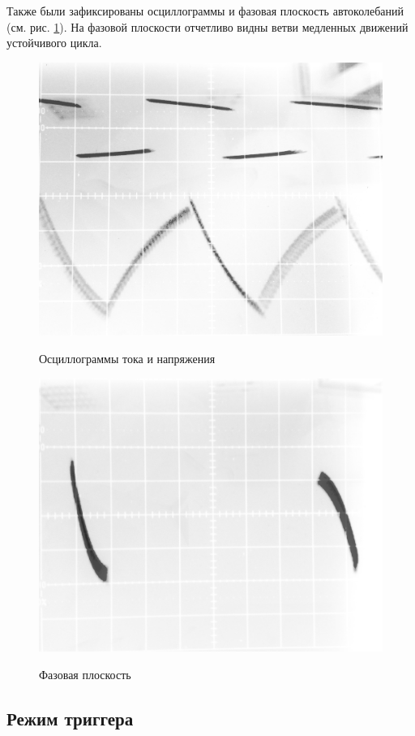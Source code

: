 Также были зафиксированы осциллограммы и фазовая плоскость автоколебаний (см. рис. \ref{fig:1}). На фазовой плоскости
отчетливо видны ветви медленных движений устойчивого цикла.
\begin{figure}[h!]
	\begin{minipage}{.49\linewidth}
		\centering
		\includegraphics[width = .7\linewidth]{img/1.jpg}
		\caption*{Осциллограммы тока и напряжения}

	\end{minipage}
	\begin{minipage}{.49\linewidth}
		\centering
		\includegraphics[width = .7\linewidth]{img/2.jpg}
		\caption*{Фазовая плоскость}
	\end{minipage}
	\caption{}
	\label{fig:1}
\end{figure}



\subsection*{Режим триггера}

